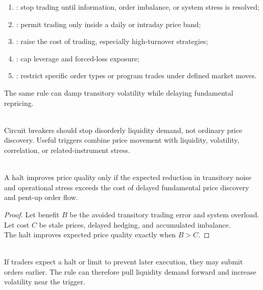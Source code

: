\begin{taxonomy} 
\begin{enumerate}[label=\roman*.]
\setlength{\itemsep}{0pt}
\item {}: stop trading until information, order imbalance, or system stress is resolved;
\item {}: permit trading only inside a daily or intraday price band;
\item {}: raise the cost of trading, especially high-turnover strategies;
\item {}: cap leverage and forced-loss exposure;
\item {}: restrict specific order types or program trades under defined market moves.
\end{enumerate}
The same rule can damp transitory volatility while delaying fundamental repricing.
\end{taxonomy}

\begin{principle} \\
Circuit breakers should stop disorderly liquidity demand, not ordinary price discovery. Useful triggers combine price movement with liquidity, volatility, correlation, or related-instrument stress.
\end{principle}

\begin{proposition} \\
A halt improves price quality only if the expected reduction in transitory noise and operational stress exceeds the cost of delayed fundamental price discovery and pent-up order flow.
\begin{proof}
Let benefit $B$ be the avoided transitory trading error and system overload. Let cost $C$ be stale prices, delayed hedging, and accumulated imbalance.\\
The halt improves expected price quality exactly when $B>C$.
\end{proof}
\end{proposition}

\begin{caveat} \\
If traders expect a halt or limit to prevent later execution, they may submit orders earlier. The rule can therefore pull liquidity demand forward and increase volatility near the trigger.
\end{caveat}

